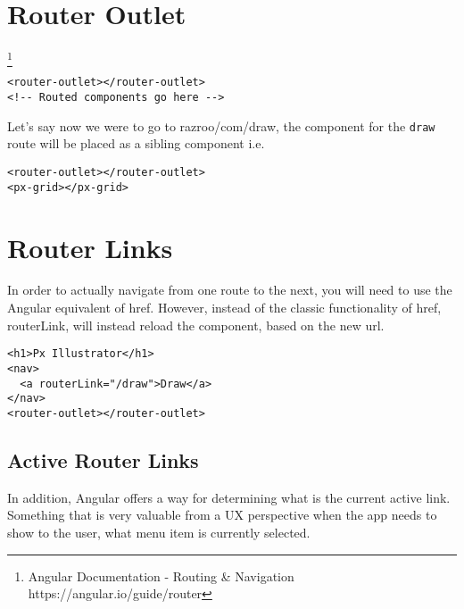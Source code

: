 
\section{ Router Outlet }
\begin{displayquote}
\footnote{Angular Documentation - Routing \& Navigation https://angular.io/guide/router}
\end{displayquote}

\begin{verbatim}
<router-outlet></router-outlet>
<!-- Routed components go here -->
\end{verbatim}

Let's say now we were to go to razroo/com/draw, the component for the 
\lstinline{draw} route will be placed as a sibling component i.e. 
\begin{lstlisting}
<router-outlet></router-outlet>
<px-grid></px-grid>  
\end{lstlisting}

\section{ Router Links }
In order to actually navigate from one route to the next, you will 
need to use the Angular equivalent of href. However, instead of 
the classic functionality of href, routerLink, will instead 
reload the component, based on the new url. 
\begin{lstlisting}
<h1>Px Illustrator</h1>
<nav>
  <a routerLink="/draw">Draw</a>
</nav>
<router-outlet></router-outlet>
\end{lstlisting}

\subsection{Active Router Links}
In addition, Angular offers a way for determining what is the current 
active link. Something that is very valuable from a UX perspective 
when the app needs to show to the user, what menu item is 
currently selected. 

